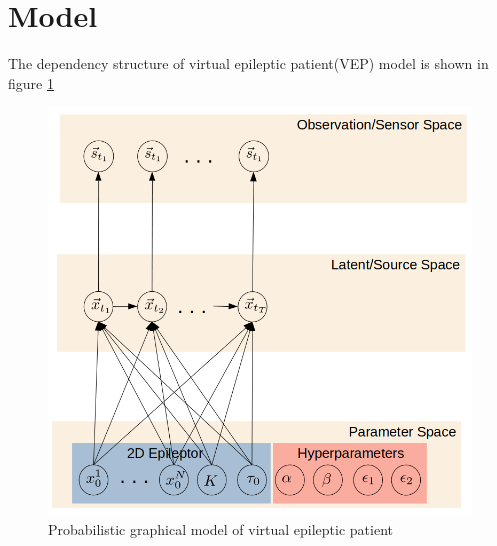 \documentclass[12pt]{article}
\begin{document}
\section*{Model}
The dependency structure of virtual epileptic patient(VEP) model is shown in figure \ref{fig:vep_model}
\begin{figure}
  \centering
  \includegraphics[width=\textwidth]{figures/vep_model.png}
  \caption{Probabilistic graphical model of virtual epileptic patient}
  \label{fig:vep_model}
\end{figure}
\end{document}
